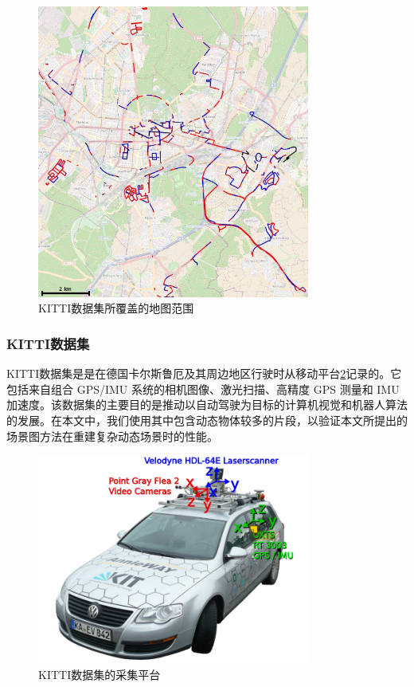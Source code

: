 \begin{figure}[ht]
    \centering
    \includegraphics[width=0.8\textwidth]{undergraduate-thesis/images/experiments/kitti-map.png}
    \caption{KITTI数据集所覆盖的地图范围}
    \label{fig:exp-kitti-map}
\end{figure}

\subsubsection{KITTI数据集}
KITTI数据集\cite{geiger_are_2012,geiger_vision_2013}是是在德国卡尔斯鲁厄及其周边地区行驶时从移动平台\ref{fig:exp-kitti-platform}记录的。它包括来自组合 GPS/IMU 系统的相机图像、激光扫描、高精度 GPS 测量和 IMU 加速度。该数据集的主要目的是推动以自动驾驶为目标的计算机视觉和机器人算法的发展。在本文中，我们使用其中包含动态物体较多的片段，以验证本文所提出的场景图方法在重建复杂动态场景时的性能。
\begin{figure}[ht]
    \centering
    \includegraphics[width=0.8\textwidth]{undergraduate-thesis/images/experiments/kitti-platform.png}
    \caption{KITTI数据集的采集平台}
    \label{fig:exp-kitti-platform}
\end{figure}

